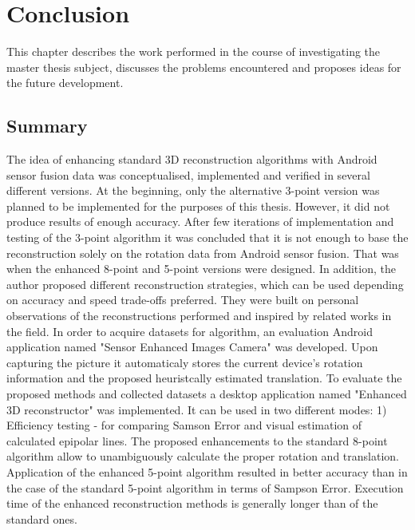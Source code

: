 
\chapter{Conclusion} %
This chapter describes the work performed in the course of investigating the master thesis subject, discusses the problems encountered and proposes ideas for the future development.

\section{Summary}
The idea of enhancing standard 3D reconstruction algorithms with Android sensor fusion data was conceptualised, implemented and verified in several different versions. At the beginning, only the alternative 3-point version was planned to be implemented for the purposes of this thesis. However, it did not produce results of enough accuracy. After few iterations of implementation and testing of the 3-point algorithm it was concluded that it is not enough to base the reconstruction solely on the rotation data from Android sensor fusion. That was when the enhanced 8-point and 5-point versions were designed. In addition, the author proposed different reconstruction strategies, which can be used depending on accuracy and speed trade-offs preferred. They were built on personal observations of the reconstructions performed and inspired by related works in the field.
In order to acquire datasets for algorithm, an evaluation Android application named "Sensor Enhanced Images Camera" was developed. Upon capturing the picture it automaticaly stores the current device's rotation information and the proposed heuristcally estimated translation. 
To evaluate the proposed methods and collected datasets a desktop application named "Enhanced 3D reconstructor" was implemented.
It can be used in two different modes:
1) Efficiency testing - for comparing  Samson Error and visual estimation of calculated epipolar lines.   
The proposed enhancements to the standard 8-point algorithm allow to unambiguously calculate the proper rotation and translation. Application of the enhanced 5-point algorithm resulted in better accuracy than in the case of the standard 5-point algorithm in terms of Sampson Error. Execution time of the enhanced reconstruction methods is generally longer than of the standard ones. 
